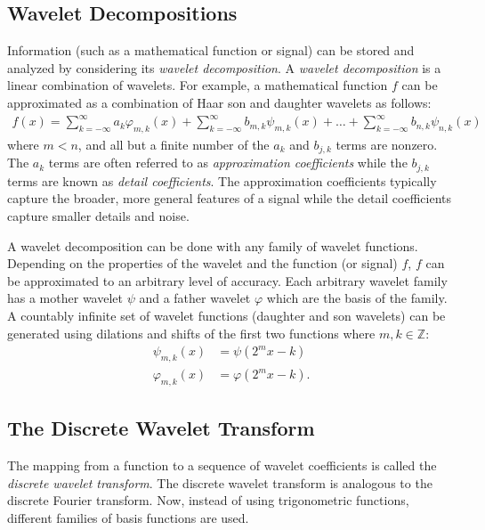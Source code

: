 \subsection*{Wavelet Decompositions}

Information (such as a mathematical function or signal) can be stored and analyzed by considering its \emph{wavelet decomposition}.
A \emph{wavelet decomposition} is a linear combination of wavelets.
For example, a mathematical function $f$ can be approximated as a combination of Haar son and daughter wavelets as follows:
\begin{align*}
f(x) = \sum_{k=-\infty}^{\infty} a_k\varphi_{m,k}(x) + \sum_{k=-\infty}^{\infty} b_{m,k}\psi_{m,k}(x) + \dots + \sum_{k=-\infty}^{\infty} b_{n,k}\psi_{n,k}(x)
\end{align*}
where $m<n$, and all but a finite number of the $a_k$ and $b_{j,k}$ terms are nonzero.
The $a_k$ terms are often referred to as \emph{approximation coefficients} while the $b_{j,k}$ terms are known as \emph{detail coefficients}.
The approximation coefficients typically capture the broader, more general features of a signal while the detail coefficients capture smaller details and noise.

A wavelet decomposition can be done with any family of wavelet functions.
Depending on the properties of the wavelet and the function (or signal) $f$, $f$ can be approximated to an arbitrary level of accuracy.
Each arbitrary wavelet family has a mother wavelet $\psi$ and a father wavelet $\varphi$ which are the basis of the family.
A countably infinite set of wavelet functions (daughter and son wavelets) can be generated using dilations and shifts of the first two functions where $m,k \in \mathbb{Z}$:
\begin{align*}
\psi_{m,k}(x) &= \psi(2^mx - k)\\
\varphi_{m,k}(x) &= \varphi(2^mx - k).
\end{align*}

\subsection*{The Discrete Wavelet Transform} %

The mapping from a function to a sequence of wavelet coefficients is called the \emph{discrete wavelet transform}.
The discrete wavelet transform is analogous to the discrete Fourier transform.
Now, instead of using trigonometric functions, different families of basis functions are used.


